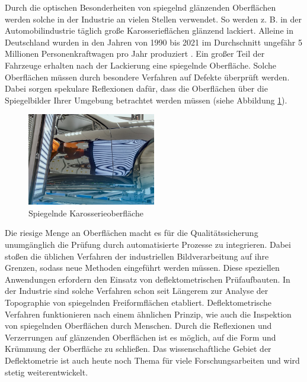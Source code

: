 Durch die optischen Besonderheiten von spiegelnd glänzenden Oberflächen werden solche in der Industrie an vielen Stellen verwendet.
So werden z. B. in der Automobilindustrie täglich große Karosserieflächen glänzend lackiert.
Alleine in Deutschland wurden in den Jahren von 1990 bis 2021 im Durchschnitt ungefähr 5 Millionen Personenkraftwagen pro Jahr produziert \cite{statistaPKW}.
Ein großer Teil der Fahrzeuge erhalten nach der Lackierung eine spiegelnde Oberfläche.
Solche Oberflächen müssen durch besondere Verfahren auf Defekte überprüft werden.
Dabei sorgen spekulare Reflexionen dafür, dass die Oberflächen über die Spiegelbilder Ihrer Umgebung betrachtet werden müssen (siehe Abbildung \ref{img:spiegelndeKarosserie}).

{
	\begin{figure}[H]
		\centering
		\includegraphics[width=0.5\textwidth]{01_einfuehrung/figures/spiegelndeKarosserie}
		\caption[Spiegelnde Karosserieoberfläche]{Spiegelnde Karosserieoberfläche \cite{spiegelndeKarosserieImg}}
		\label{img:spiegelndeKarosserie}
	\end{figure}
}

\noindent
Die riesige Menge an Oberflächen macht es für die Qualitätssicherung unumgänglich die Prüfung durch automatisierte Prozesse zu integrieren.
Dabei stoßen die üblichen Verfahren der industriellen Bildverarbeitung auf ihre Grenzen, sodass neue Methoden eingeführt werden müssen.
Diese speziellen Anwendungen erfordern den Einsatz von deflektometrischen Prüfaufbauten.
In der Industrie sind solche Verfahren schon seit Längerem zur Analyse der Topographie von spiegelnden Freiformflächen etabliert.
Deflektometrische Verfahren funktionieren nach einem ähnlichen Prinzip, wie auch die Inspektion von spiegelnden Oberflächen durch Menschen. 
Durch die Reflexionen und Verzerrungen auf glänzenden Oberflächen ist es möglich, auf die Form und Krümmung der Oberfläche zu schließen.
Das wissenschaftliche Gebiet der Deflektometrie ist auch heute noch Thema für viele Forschungsarbeiten und wird stetig weiterentwickelt.

